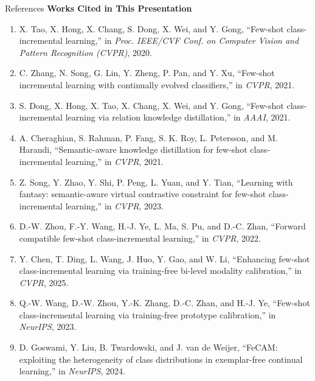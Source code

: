 \documentclass[aspectratio=169,10pt]{beamer}
\begin{document}
\begin{frame}{References}
    \textbf{Works Cited in This Presentation}

    \vspace{0.4em}
    {\scriptsize
    \begin{enumerate}
        \setlength{\itemsep}{3pt}
        \item X. Tao, X. Hong, X. Chang, S. Dong, X. Wei, and Y. Gong, ``Few-shot class-incremental learning,'' in \textit{Proc. IEEE/CVF Conf. on Computer Vision and Pattern Recognition (CVPR)}, 2020.
        \item C. Zhang, N. Song, G. Lin, Y. Zheng, P. Pan, and Y. Xu, ``Few-shot incremental learning with continually evolved classifiers,'' in \textit{CVPR}, 2021.
        \item S. Dong, X. Hong, X. Tao, X. Chang, X. Wei, and Y. Gong, ``Few-shot class-incremental learning via relation knowledge distillation,'' in \textit{AAAI}, 2021.
        \item A. Cheraghian, S. Rahman, P. Fang, S. K. Roy, L. Petersson, and M. Harandi, ``Semantic-aware knowledge distillation for few-shot class-incremental learning,'' in \textit{CVPR}, 2021.
        \item Z. Song, Y. Zhao, Y. Shi, P. Peng, L. Yuan, and Y. Tian, ``Learning with fantasy: semantic-aware virtual contrastive constraint for few-shot class-incremental learning,'' in \textit{CVPR}, 2023.
        \item D.-W. Zhou, F.-Y. Wang, H.-J. Ye, L. Ma, S. Pu, and D.-C. Zhan, ``Forward compatible few-shot class-incremental learning,'' in \textit{CVPR}, 2022.
        \item Y. Chen, T. Ding, L. Wang, J. Huo, Y. Gao, and W. Li, ``Enhancing few-shot class-incremental learning via training-free bi-level modality calibration,'' in \textit{CVPR}, 2025.
        \item Q.-W. Wang, D.-W. Zhou, Y.-K. Zhang, D.-C. Zhan, and H.-J. Ye, ``Few-shot class-incremental learning via training-free prototype calibration,'' in \textit{NeurIPS}, 2023.
        \item D. Goswami, Y. Liu, B. Twardowski, and J. van de Weijer, ``FeCAM: exploiting the heterogeneity of class distributions in exemplar-free continual learning,'' in \textit{NeurIPS}, 2024.
    \end{enumerate}
    }
\end{frame}
\end{document}
